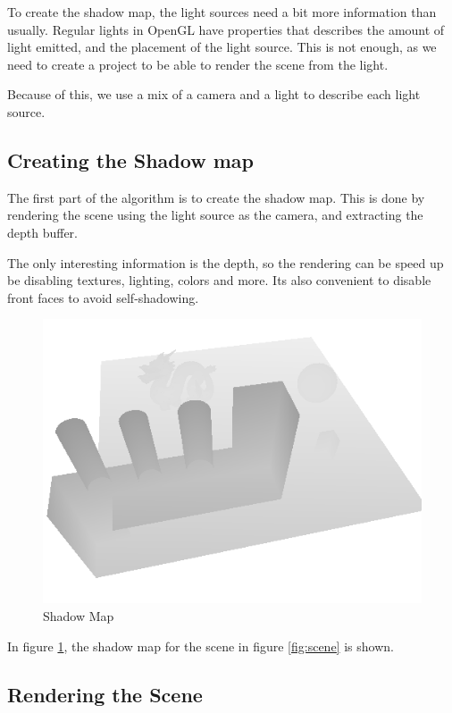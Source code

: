 To create the shadow map, the light sources need a bit more
information than usually. Regular lights in OpenGL have properties
that describes the amount of light emitted, and the placement of the
light source. This is not enough, as we need to create a project to be
able to render the scene from the light.

Because of this, we use a mix of a camera and a light to describe each
light source. 

\subsection{Creating the Shadow map}

The first part of the algorithm is to create the shadow map. This is
done by rendering the scene using the light source as the camera, and
extracting the depth buffer.

The only interesting information is the depth, so the rendering can be
speed up be disabling textures, lighting, colors and more. Its also
convenient to disable front faces to avoid self-shadowing. %

\begin{figure}[h]
  \centering
  \includegraphics[width=\textwidth]{gfx/shadowmap}  
  \caption{Shadow Map}
  \label{fig:shadowmap}
\end{figure}

In figure \ref{fig:shadowmap}, the shadow map for the scene in figure
\ref{fig:scene} is shown.

\subsection{Rendering the Scene}\label{sec:render}



